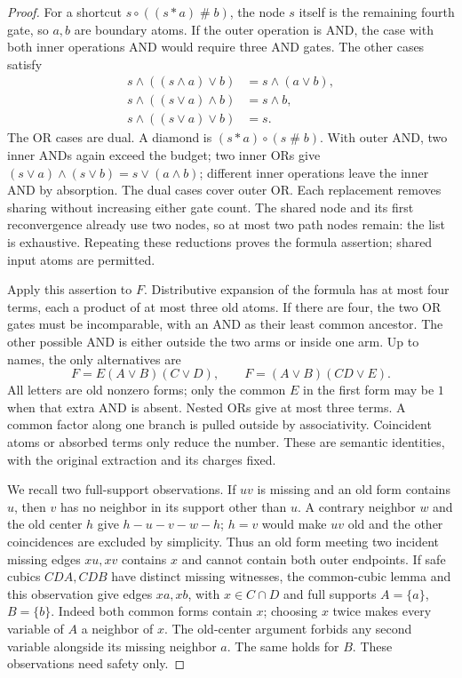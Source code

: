 \documentclass[11pt]{article}
\theoremstyle{definition}
\theoremstyle{remark}
\begin{document}
\begin{proof}
For a shortcut $s\circ((s\mathbin{*}a)\mathbin{\#}b)$, the node
$s$ itself is the remaining fourth gate, so $a,b$ are boundary atoms.
If the outer operation is AND, the case with both inner operations AND
would require three AND gates. The other cases satisfy
\[
\begin{split}
 s\wedge((s\wedge a)\vee b)&=s\wedge(a\vee b),\\
 s\wedge((s\vee a)\wedge b)&=s\wedge b,\\
 s\wedge((s\vee a)\vee b)&=s.
\end{split}
\]
The OR cases are dual. A diamond is
$(s\mathbin{*}a)\circ(s\mathbin{\#}b)$. With outer AND, two inner
ANDs again exceed the budget; two inner ORs give
$(s\vee a)\wedge(s\vee b)=s\vee(a\wedge b)$; different inner
operations leave the inner AND by absorption. The dual cases cover outer
OR. Each replacement removes sharing without increasing either gate count.
The shared node and its first reconvergence already use two nodes, so at
most two path nodes remain: the list is exhaustive. Repeating these
reductions proves the formula assertion; shared input atoms are permitted.

Apply this assertion to $F$. Distributive expansion of the formula has
at most four terms, each a product of at most three old atoms. If there
are four, the two OR gates must be incomparable, with an AND as their
least common ancestor. The other possible AND is either outside the two
arms or inside one arm. Up to names, the only alternatives are
\[
 F=E(A\vee B)(C\vee D),\qquad
 F=(A\vee B)(CD\vee E).                         \tag{*}
\]
All letters are old nonzero forms; only the common $E$ in the first form
may be $1$ when that extra AND is absent. Nested ORs give at most three
terms. A common factor along one branch is pulled outside by associativity.
Coincident atoms or absorbed terms only reduce the number. These are
semantic identities, with the original extraction and its charges fixed.

We recall two full-support observations. If $uv$ is missing and an old
form contains $u$, then $v$ has no neighbor in its support other than $u$.
A contrary neighbor $w$ and the old center $h$ give $h-u-v-w-h$;
$h=v$ would make $uv$ old and the other coincidences are excluded by
simplicity. Thus an old form meeting two incident missing edges $xu,xv$
contains $x$ and cannot contain both outer endpoints.
If safe cubics $CDA,CDB$ have distinct missing witnesses, the common-cubic
lemma and this observation give edges $xa,xb$, with $x\in C\cap D$ and
full supports $A=\{a\}$, $B=\{b\}$. Indeed both common forms contain
$x$; choosing $x$ twice makes every variable of $A$ a neighbor of $x$.
The old-center argument forbids any second variable alongside its missing
neighbor $a$. The same holds for $B$. These observations need safety only.


\end{proof}
\end{document}
